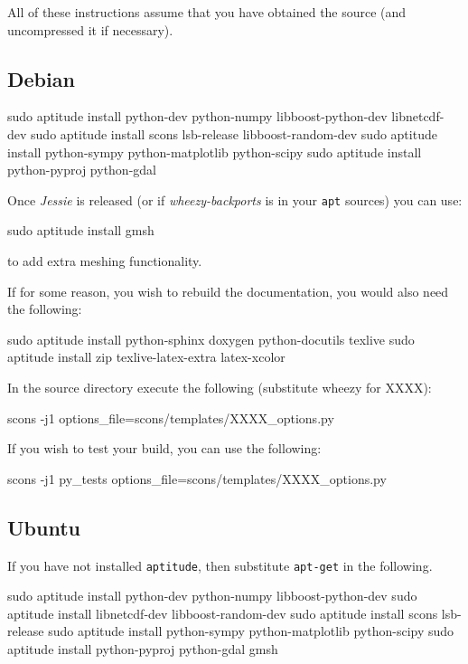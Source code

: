 All of these instructions assume that you have obtained the \escript source (and uncompressed it if necessary).
\subsection{Debian}\label{sec:debsrc}

\begin{shellCode}
sudo aptitude install python-dev python-numpy libboost-python-dev libnetcdf-dev 
sudo aptitude install scons lsb-release  libboost-random-dev
sudo aptitude install python-sympy python-matplotlib python-scipy
sudo aptitude install python-pyproj python-gdal 
\end{shellCode}

\noindent Once \textit{Jessie} is released (or if \textit{wheezy-backports} is in your \texttt{apt} sources) you can use:
\begin{shellCode}
sudo aptitude install gmsh 
\end{shellCode}
to add extra meshing functionality.

\begin{optionalstep}
If for some reason, you wish to rebuild the documentation, you would also need the following:
\begin{shellCode}
sudo aptitude install python-sphinx doxygen python-docutils texlive 
sudo aptitude install zip texlive-latex-extra latex-xcolor 
\end{shellCode}
\end{optionalstep}

\noindent In the source directory execute the following (substitute wheezy for XXXX):
\begin{shellCode}
scons -j1 options_file=scons/templates/XXXX_options.py
\end{shellCode}

\noindent If you wish to test your build, you can use the following:
\begin{shellCode}
scons -j1 py_tests options_file=scons/templates/XXXX_options.py 
\end{shellCode}

\subsection{Ubuntu}\label{sec:ubsrc}

If you have not installed \texttt{aptitude}, then substitute \texttt{apt-get} in the following.
\begin{shellCode}
sudo aptitude install python-dev python-numpy libboost-python-dev 
sudo aptitude install libnetcdf-dev libboost-random-dev
sudo aptitude install scons lsb-release
sudo aptitude install python-sympy python-matplotlib python-scipy
sudo aptitude install python-pyproj python-gdal gmsh
\end{shellCode}


